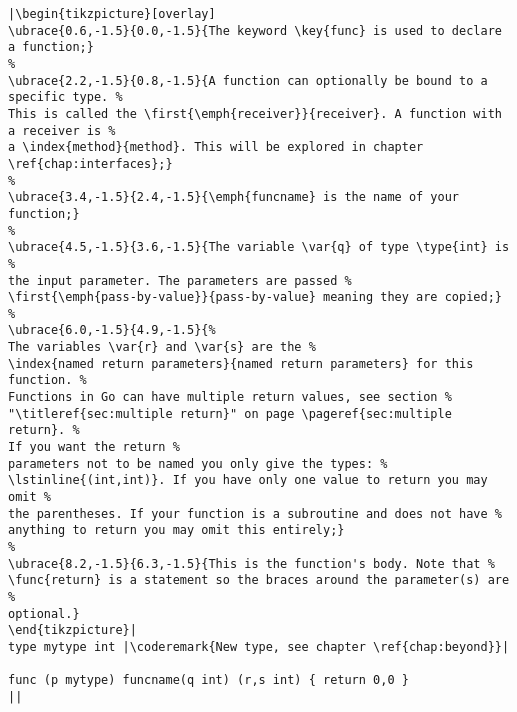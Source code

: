 \begin{lstlisting}[caption=A function declaration,label=src:function definition]
|\begin{tikzpicture}[overlay]
\ubrace{0.6,-1.5}{0.0,-1.5}{The keyword \key{func} is used to declare a function;}
%
\ubrace{2.2,-1.5}{0.8,-1.5}{A function can optionally be bound to a specific type. %
This is called the \first{\emph{receiver}}{receiver}. A function with a receiver is %
a \index{method}{method}. This will be explored in chapter \ref{chap:interfaces};}
%
\ubrace{3.4,-1.5}{2.4,-1.5}{\emph{funcname} is the name of your function;}
%
\ubrace{4.5,-1.5}{3.6,-1.5}{The variable \var{q} of type \type{int} is %
the input parameter. The parameters are passed %
\first{\emph{pass-by-value}}{pass-by-value} meaning they are copied;}
%
\ubrace{6.0,-1.5}{4.9,-1.5}{%
The variables \var{r} and \var{s} are the %
\index{named return parameters}{named return parameters} for this function. %
Functions in Go can have multiple return values, see section %
"\titleref{sec:multiple return}" on page \pageref{sec:multiple return}. %
If you want the return %
parameters not to be named you only give the types: %
\lstinline{(int,int)}. If you have only one value to return you may omit %
the parentheses. If your function is a subroutine and does not have %
anything to return you may omit this entirely;}
%
\ubrace{8.2,-1.5}{6.3,-1.5}{This is the function's body. Note that %
\func{return} is a statement so the braces around the parameter(s) are %
optional.}
\end{tikzpicture}|
type mytype int	|\coderemark{New type, see chapter \ref{chap:beyond}}|

func (p mytype) funcname(q int) (r,s int) { return 0,0 }
||
\end{lstlisting}

